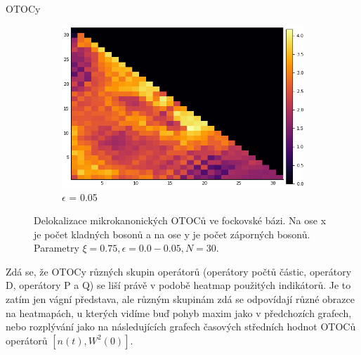 \documentclass{article}
\begin{document}
\begin{section}{OTOCy}
\begin{figure}[H]
\begin{subfigure}{.33\textwidth}
      
                                  \end{subfigure}%
                                  \begin{subfigure}{.33\textwidth}
                                    \centering
                                    \includegraphics[width=1.0\linewidth]{HM6.png}
                                  \caption{$\epsilon$ = 0.05}
    
                                \end{subfigure}
    
    
                                \caption{Delokalizace mikrokanonických OTOCů ve fockovské bázi. Na ose x je počet kladných bosonů a na 
                                ose y je počet záporných bosonů. Parametry $\xi = 0.75, \epsilon = 0.0 - 0.05, N = 30$.}
                                \end{figure}


                                Zdá se, že OTOCy různých skupin operátorů (operátory počtů částic, operátory D, operátory P a Q) 
                                se liší právě v podobě heatmap použitých indikátorů. Je to zatím jen vágní představa, ale různým
                                skupinám zdá se odpovídají různé obrazce na heatmapách, u kterých vidíme buď pohyb maxim jako 
                                v předchozích grafech, nebo rozplývání jako na následujících grafech časových středních hodnot
                                OTOCů operátorů $[n(t),W^2(0)]$. 



\end{section}
\end{document}
